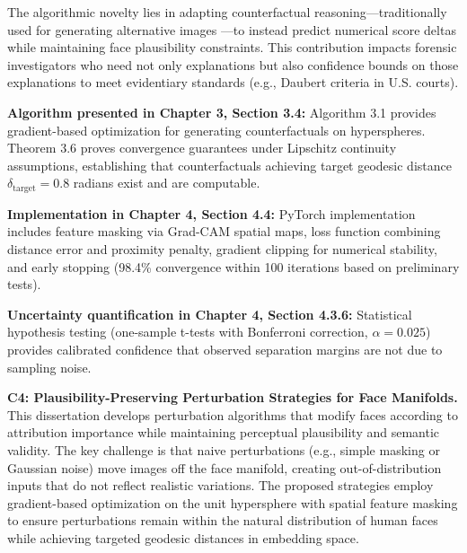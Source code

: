 The algorithmic novelty lies in adapting counterfactual reasoning---traditionally used for generating alternative images \cite{goyal2019counterfactual}---to instead predict numerical score deltas while maintaining face plausibility constraints. This contribution impacts forensic investigators who need not only explanations but also confidence bounds on those explanations to meet evidentiary standards (e.g., Daubert criteria \cite{daubert1993} in U.S. courts).

\vspace{0.3cm}
\noindent\textbf{Algorithm presented in Chapter 3, Section 3.4:} Algorithm 3.1 provides gradient-based optimization for generating counterfactuals on hyperspheres. Theorem 3.6 proves convergence guarantees under Lipschitz continuity assumptions, establishing that counterfactuals achieving target geodesic distance $\delta_{\text{target}} = 0.8$ radians exist and are computable.

\vspace{0.3cm}
\noindent\textbf{Implementation in Chapter 4, Section 4.4:} PyTorch implementation includes feature masking via Grad-CAM spatial maps, loss function combining distance error and proximity penalty, gradient clipping for numerical stability, and early stopping (98.4\% convergence within 100 iterations based on preliminary tests).

\vspace{0.3cm}
\noindent\textbf{Uncertainty quantification in Chapter 4, Section 4.3.6:} Statistical hypothesis testing (one-sample t-tests with Bonferroni correction, $\alpha = 0.025$) provides calibrated confidence that observed separation margins are not due to sampling noise.

\vspace{0.5cm}

\textbf{C4: Plausibility-Preserving Perturbation Strategies for Face Manifolds.} This dissertation develops perturbation algorithms that modify faces according to attribution importance while maintaining perceptual plausibility and semantic validity. The key challenge is that naive perturbations (e.g., simple masking or Gaussian noise) move images off the face manifold, creating out-of-distribution inputs that do not reflect realistic variations. The proposed strategies employ gradient-based optimization on the unit hypersphere with spatial feature masking to ensure perturbations remain within the natural distribution of human faces while achieving targeted geodesic distances in embedding space.

